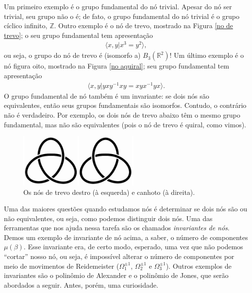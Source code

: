 	\par\vspace{0.3cm} Um primeiro exemplo é o grupo fundamental do nó trivial. 
	Apesar do nó ser trivial, seu grupo não o é; de fato, o grupo fundamental do nó 
	trivial é o grupo cíclico infinito, $\mathbb{Z}$. Outro exemplo é o nó de trevo, 
	mostrado na Figura \ref{no de trevo}; o seu grupo fundamental tem apresentação
	\begin{align*}
	    \langle x,y|x^3 = y^2 \rangle,
	\end{align*}
	ou seja, o grupo do nó de trevo é (isomorfo a) $B_3(\mathbb{R}^2)$! Um último exemplo é o nó figura oito, mostrado na Figura \ref{no aquiral}; seu grupo fundamental tem apresentação
	\begin{align*}
	    \langle x,y | yxy^{-1}xy = xyx^{-1}yx \rangle.
	\end{align*}
	O grupo fundamental de nó também é um invariante: se dois nós são equivalentes, 
	então seus grupos fundamentais são isomorfos. Contudo, o contrário não é verdadeiro. 
	Por exemplo, os dois nós de trevo abaixo têm o mesmo grupo fundamental, mas não são 
	equivalentes (pois o nó de trevo é quiral, como vimos).
	\begin{figure}[H]
		\begin{center}
			\includegraphics[width=6cm]{Images/nos_de_trevo.png}
		\end{center}\caption{Os nós de trevo destro (à esquerda) e canhoto (à direita).}\label{nos de trevo destro e canhoto}
	\end{figure} 
	Uma das maiores questões quando estudamos nós é determinar se dois nós são ou não 
	equivalentes, ou seja, como podemos distinguir dois nós. Uma das ferramentas que nos 
	ajuda nessa tarefa são os chamados \textit{invariantes de nós}. Demos um exemplo de 
	invariante de nó acima, a saber, o número de componentes $\mu(\beta)$. 
	Esse invariante era, de certo modo, esperado, uma vez que não podemos ``cortar'' nosso nó, 
	ou seja, é impossível alterar o número de componentes por meio de movimentos de Reidemeister
	($\Omega_1^{\pm1}$, $\Omega_2^{\pm1}$ e $\Omega_3^{\pm1}$). Outros exemplos de invariantes 
	são o polinômio de Alexander e o polinômio de Jones, que serão abordados a seguir. Antes, 
	porém, uma curiosidade.
	
